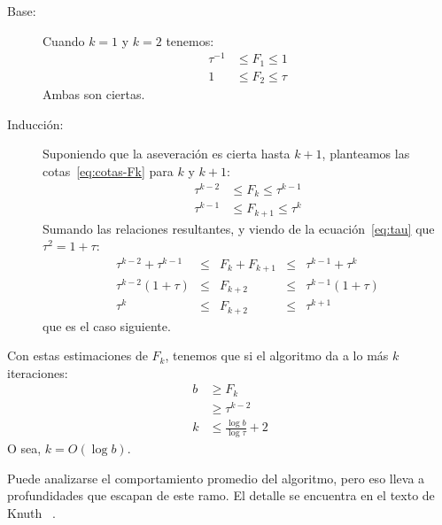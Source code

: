  \begin{description}
  \item[Base:]
    Cuando \(k = 1\) y \(k = 2\) tenemos:
    \begin{align*}
      \tau^{-1}
	&\le F_1 \le 1 \\
      1
	&\le F_2 \le \tau
    \end{align*}
    Ambas son ciertas.
  \item[Inducción:]
    Suponiendo que la aseveración es cierta hasta \(k + 1\),
    planteamos las cotas~\eqref{eq:cotas-Fk} para \(k\) y \(k + 1\):
    \begin{align*}
      \tau^{k - 2} &\le F_k	  \le \tau^{k - 1}	\\
      \tau^{k - 1} &\le F_{k + 1} \le \tau^k
    \end{align*}
    Sumando las relaciones resultantes,
    y viendo de la ecuación~\eqref{eq:tau}
    que \(\tau^2 = 1 + \tau\):
    \begin{equation*}
      \begin{array}{rcccl}
	\tau^{k - 2} + \tau^{k - 1}
	  &\le & F_k + F_{k + 1}
	  &\le & \tau^{k - 1} + \tau^k \\
	\tau^{k - 2}(1 + \tau)
	  &\le & F_{k + 2}
	  &\le & \tau^{k - 1} (1 + \tau) \\
	\tau^k
	  &\le & F_{k + 2}
	  &\le & \tau^{k + 1}
      \end{array}
    \end{equation*}
    que es el caso siguiente.
  \end{description}

  Con estas estimaciones de \(F_k\),
  tenemos que si el algoritmo da a lo más \(k\) iteraciones:
  \begin{align*}
    b &\ge F_k \\
      &\ge \tau^{k - 2} \\
    k &\le \frac{\log b}{\log \tau} + 2
  \end{align*}
  O sea,
  \(k = O(\log b)\).

  Puede analizarse el comportamiento promedio del algoritmo,
  pero eso lleva a profundidades que escapan de este ramo.
  El detalle se encuentra en el texto de Knuth~%
    \cite{knuth97:_semin_algor}.

